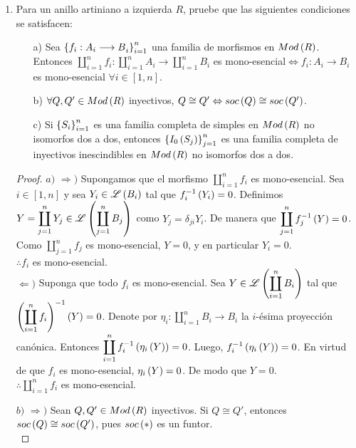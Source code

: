 \documentclass{article}
\begin{document}
\begin{enumerate}[label=\textbf{Ej \arabic*.}]
	\item Para un anillo artiniano a izquierda $R$, pruebe que las siguientes condiciones se satisfacen:
	\begin{enumerate}
		\item[a)] Sea ${\left\{{f_{i}:A_{i} \longrightarrow B}_{i}\right\}}_{i=1}^{n}$ una familia de morfismos en $Mod\left(R\right)$. Entonces $\displaystyle\coprod_{i=1}^{n}f_{i}:\displaystyle\coprod_{i=1}^{n}A_{i}\longrightarrow\displaystyle\coprod_{i=1}^{n}B_{i}$ es mono-esencial$\Leftrightarrow f_{i}:A_{i} \longrightarrow B_{i}$ es mono-esencial $\forall i \in [1,n]$.
		\item[b)] $\forall Q,Q'\in Mod\left(R\right)$ inyectivos, $Q \cong Q' \Leftrightarrow soc\left(Q\right) \cong soc\left(Q'\right)$.
		\item[c)] Si ${\left\{{S}_{i}\right\}}_{i=1}^{n}$ es una familia completa de simples en $Mod\left(R\right)$ no isomorfos dos a dos, entonces $\left\{I_{0}\left(S_{j}\right)\right\}_{j=1}^{n}$ es una familia completa de inyectivos inescindibles en $Mod\left(R\right)$ no isomorfos dos a dos.
	\end{enumerate}
	\begin{proof}
		$\boxed{a)}$ $\boxed{\Rightarrow )}$ Supongamos que el morfismo $\displaystyle\coprod_{i=1}^{n}f_{i}$ es mono-esencial. Sea $i \in [1,n]$ y sea $Y_{i}\in\mathscr{L}\left(B_{i}\right)$ tal que $f_{i}^{-1}\left(Y_{i}\right)=0$. Definimos $Y=\displaystyle\coprod_{j=1}^{n}Y_{j}\in\mathscr{L}\left(\displaystyle\coprod_{j=1}^{n}B_{j}\right)$ como $Y_{j}=\delta_{ji}Y_{i}$. De manera que $\displaystyle\coprod_{j=1}^{n}f_{j}^{-1}\left(Y\right)=0$. Como $\displaystyle\coprod_{j=1}^{n}f_{j}$ es mono-esencial, $Y=0$, y en particular $Y_{i}=0$.\\
		$\therefore f_{i}$ es mono-esencial.\\
		
		$\boxed{\Leftarrow )}$ Suponga que todo $f_{i}$ es mono-esencial. Sea $Y\in\mathscr{L}\left(\displaystyle\coprod_{i=1}^{n}B_{i}\right)$ tal que $\left(\displaystyle\coprod_{i=1}^{n}f_{i}\right)^{-1}\left(Y\right)=0$. Denote por $\eta_{i}:\displaystyle\coprod_{i=1}^{n}B_{i} \longrightarrow B_{i}$ la $i$-ésima proyección canónica. Entonces $\displaystyle\coprod_{i=1}^{n}f_{i}^{-1}\left(\eta_{i}\left(Y\right)\right)=0$. Luego, $f_{i}^{-1}\left(\eta_{i}\left(Y\right)\right)=0$. En virtud de que $f_{i}$ es mono-esencial, $\eta_{i}\left(Y\right)=0$. De modo que $Y=0$.\\
		$\therefore\displaystyle\coprod_{i=1}^{n}f_{i}$ es mono-esencial.
		
		$\boxed{b)}$ $\boxed{\Rightarrow )}$ Sean $Q,Q' \in Mod\left(R\right)$ inyectivos. Si $Q \cong Q'$, entonces $soc\left(Q\right) \cong soc\left(Q'\right)$, pues $soc\left(*\right)$ es un funtor.\\
		

\end{proof}
\end{enumerate}
\end{document}
